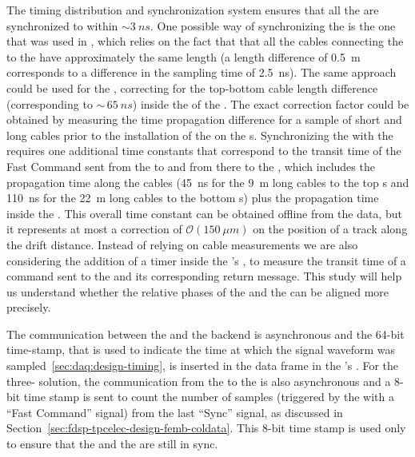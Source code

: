 The timing distribution and synchronization system ensures that
all the  are synchronized to within $\sim\SI{3}{ns}$. 
One possible way of synchronizing the  is the one
that was used in , which relies on the fact that 
that all the cables connecting the  to the
 have approximately the same length (a length 
difference of \SI{0.5}{m} corresponds to a difference in the
sampling time of \SI{2.5}{ns}). The same approach could be used
for the  , correcting for the top-bottom 
 cable length difference (corresponding to $\sim\,\SI{65}{ns}$) 
inside the  of the . The exact correction
factor could be obtained by measuring the time propagation 
difference for a sample of short and long cables prior to the 
installation of the  on the s. 
Synchronizing the  with the  requires one
additional time constants that correspond to the transit 
time of the Fast Command sent from the  to
 and from there to the ,
which includes the propagation time along the cables
(\SI{45}{ns} for the \SI{9}{m} long cables to the top s
and \SI{110}{ns} for the \SI{22}{m} long cables to the bottom s) 
plus the propagation time inside the . This overall 
time constant can be obtained offline from the data, but it represents 
at most a correction of $\mathcal{O}(\SI{150}{\mu m})$ on the 
position of a track along the drift distance.
Instead of relying on cable measurements we are also considering
the addition of a timer inside the 's ,
to measure the transit time of a command
sent to the  and its corresponding return
message. This study will help us understand whether the 
relative phases of the  and the  
can be aligned more precisely.

The communication between the  and the  
backend is asynchronous and the \num{64}-bit time-stamp, that
is used to indicate the time at which the signal waveform was
sampled~\ref{sec:daq:design-timing}, is inserted in the data frame
in the 's . 
For the three- solution, the communication
from the  to the  is also
asynchronous and a \num{8}-bit time stamp is sent to
count the number of  samples (triggered by
the  with a ``Fast Command'' signal) from the last
``Sync'' signal, as discussed in Section~\ref{sec:fdsp-tpcelec-design-femb-coldata}.
This \num{8}-bit time stamp is used only to ensure
that the  and the  are
still in sync. 


